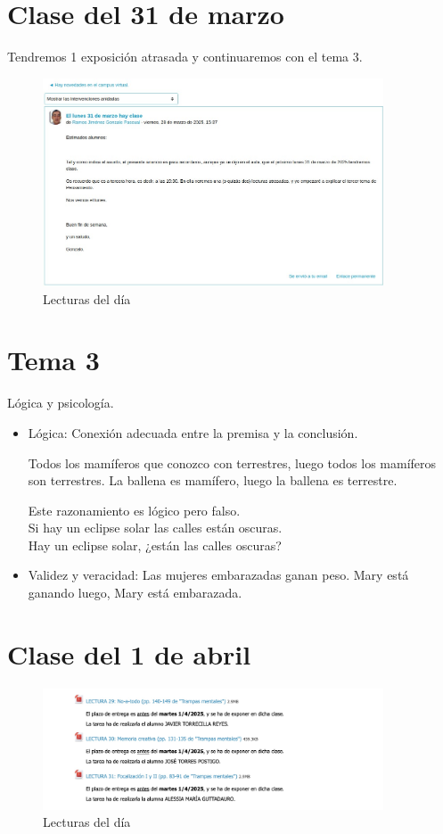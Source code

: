 \documentclass[12pt, a4paper, twoside]{article}
\begin{document}
\section{Clase del 31 de marzo} 

Tendremos 1 exposición atrasada y continuaremos con el tema 3.
\begin{figure}[h]
    \centering
    \includegraphics[width=0.9\textwidth]{./Images/0331.jpg}
    \caption{Lecturas del día}
\end{figure}


\section {Tema 3}
Lógica y psicología.\\
\begin{itemize}
    \item{Lógica:} Conexión adecuada entre la premisa y la conclusión.
    
    Todos los mamíferos que conozco con terrestres, luego todos los mamíferos son terrestres.
    La ballena es mamífero, luego la ballena es terrestre.

    Este razonamiento es lógico pero falso.\\

    Si hay un eclipse solar las calles están oscuras.\\
    Hay un eclipse solar, ¿están las calles oscuras?\\
    \item{Validez y veracidad:} Las mujeres embarazadas ganan peso. Mary está ganando
    luego, Mary está embarazada.\\
\end{itemize}
\section{Clase del 1 de abril}
\begin{figure}[h]
    \centering
    \includegraphics[width=0.9\textwidth]{./Images/0401.jpg}
    \caption{Lecturas del día}
\end{figure}
\end{document}
